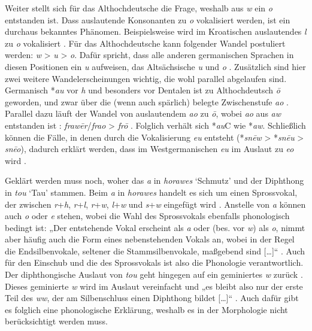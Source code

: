 Weiter stellt sich für das Althochdeutsche die Frage, weshalb aus \textit{w} ein \textit{o} entstanden ist. Dass auslautende Konsonanten zu \textit{o} vokalisiert werden, ist ein durchaus bekanntes Phänomen. Beispielsweise wird im Kroatischen auslautendes \textit{l} zu \textit{o} vokalisiert \citep[84]{Holzer2007}. Für das Althochdeutsche kann folgender Wandel postuliert werden: \textit{w} > \textit{u} > \textit{o}. Dafür spricht, dass alle anderen germanischen Sprachen in diesen Positionen ein \textit{u} aufweisen, das Altsächsische \textit{u} und \textit{o} \citep[18--19]{KraheMeid1967}. Zusätzlich sind hier zwei weitere Wandelerscheinungen wichtig, die wohl parallel abgelaufen sind. Germanisch *\textit{au} vor \textit{h} und besonders vor Dentalen ist zu Althochdeutsch \textit{\=o} geworden, und zwar über die (wenn auch spärlich) belegte Zwischenstufe \textit{ao} \citep[47]{Braune2004}. Parallel dazu läuft der Wandel von auslautendem \textit{ao} zu \textit{\=o}, wobei \textit{ao} aus \textit{aw} entstanden ist \citep[48]{Braune2004}: \textit{fraw\=er}/\textit{frao} > \textit{fr\=o} \citep[112]{Braune2004}. Folglich verhält sich *\textit{au}C wie *\textit{aw}. Schließlich können die Fälle, in denen durch die Vokalisierung \textit{eu} entsteht (*\textit{sn\=ew} > *\textit{sn\=eu} > \textit{sn\=eo}), dadurch erklärt werden, dass im Westgermanischen \textit{eu} im Auslaut zu \textit{eo} wird \citep[68, 167]{VoylesBarrack2014}.

Geklärt werden muss noch, woher das \textit{a} in \textit{horawes} ‘Schmutz’ und der Diphthong in \textit{tou} ‘Tau’ stammen. Beim \textit{a} in \textit{horawes} handelt es sich um einen Sprossvokal, der zwischen \textit{r}+\textit{h}, \textit{r}+\textit{l}, \textit{r}+\textit{w}, \textit{l}+\textit{w} und \textit{s}+\textit{w} eingefügt wird \citep[71]{Braune2004}. Anstelle von \textit{a} können auch \textit{o} oder \textit{e} stehen, wobei die Wahl des Sprossvokals ebenfalls phonologisch bedingt ist: „Der entstehende Vokal erscheint als \textit{a} oder (bes. vor \textit{w}) als \textit{o}, nimmt aber häufig auch die Form eines nebenstehenden Vokals an, wobei in der Regel die Endsilbenvokale, seltener die Stammsilbenvokale, maßgebend sind […]“ \citep[71]{Braune2004}. Auch für den Einschub und die  des Sprossvokals ist also die Phonologie verantwortlich. Der diphthongische Auslaut von \textit{tou} geht hingegen auf ein geminiertes \textit{w} zurück \citep[109]{Braune2004}. Dieses geminierte \textit{w} wird im Auslaut vereinfacht und „es bleibt also nur der erste Teil des \textit{ww}, der am Silbenschluss einen Diphthong bildet […]“ \citep[111-112]{Braune2004}. Auch dafür gibt es folglich eine phonologische Erklärung, weshalb es in der Morphologie nicht berücksichtigt werden muss.

